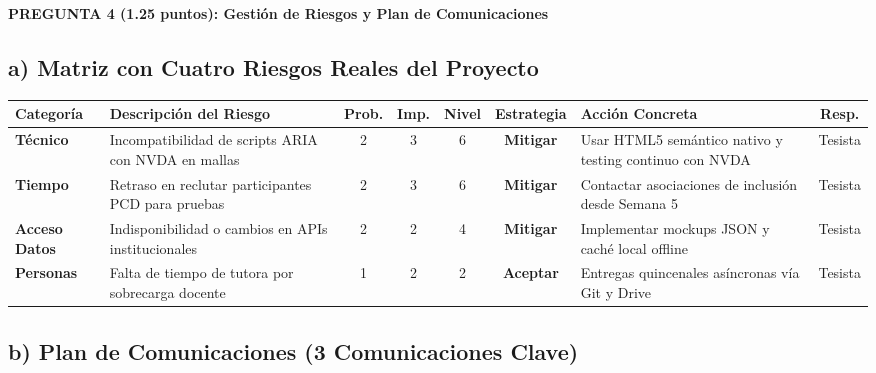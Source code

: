 \documentclass[10pt,a4paper]{article}
\begin{document}
\vspace{0.2cm}

\begin{tcolorbox}[colback=utiLightBlue, colframe=utiBlue, arc=3pt, left=6pt, right=6pt, top=4pt, bottom=4pt]
\textbf{\color{utiNavy}PREGUNTA 4 (1.25 puntos): Gestión de Riesgos y Plan de Comunicaciones}
\end{tcolorbox}

\subsection*{\normalsize\color{utiNavy}a) Matriz con Cuatro Riesgos Reales del Proyecto}

\begin{center}
\footnotesize
\renewcommand{\arraystretch}{1.1}
\begin{tabularx}{\textwidth}{p{1.8cm} X c c c c X c}
\toprule
\textbf{Categoría} & \textbf{Descripción del Riesgo} & \textbf{Prob.} & \textbf{Imp.} & \textbf{Nivel} & \textbf{Estrategia} & \textbf{Acción Concreta} & \textbf{Resp.} \\
\midrule
\textbf{Técnico} & Incompatibilidad de scripts ARIA con NVDA en mallas & 2 & 3 & 6 & \textbf{Mitigar} & Usar HTML5 semántico nativo y testing continuo con NVDA & Tesista \\
\textbf{Tiempo} & Retraso en reclutar participantes PCD para pruebas & 2 & 3 & 6 & \textbf{Mitigar} & Contactar asociaciones de inclusión desde Semana 5 & Tesista \\
\textbf{Acceso Datos} & Indisponibilidad o cambios en APIs institucionales & 2 & 2 & 4 & \textbf{Mitigar} & Implementar mockups JSON y caché local offline & Tesista \\
\textbf{Personas} & Falta de tiempo de tutora por sobrecarga docente & 1 & 2 & 2 & \textbf{Aceptar} & Entregas quincenales asíncronas vía Git y Drive & Tesista \\
\bottomrule
\end{tabularx}
\end{center}

\subsection*{\normalsize\color{utiNavy}b) Plan de Comunicaciones (3 Comunicaciones Clave)}
\end{document}
